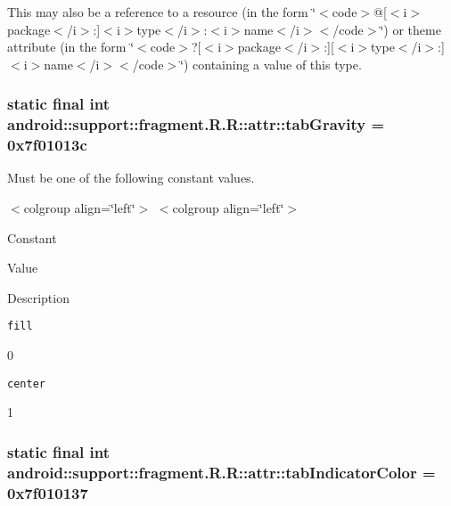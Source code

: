 This may also be a reference to a resource (in the form \char`\"{}$<$code$>$@\mbox{[}$<$i$>$package$<$/i$>$:\mbox{]}$<$i$>$type$<$/i$>$:$<$i$>$name$<$/i$>$$<$/code$>$\char`\"{}) or theme attribute (in the form \char`\"{}$<$code$>$?\mbox{[}$<$i$>$package$<$/i$>$:\mbox{]}\mbox{[}$<$i$>$type$<$/i$>$:\mbox{]}$<$i$>$name$<$/i$>$$<$/code$>$\char`\"{}) containing a value of this type. \hypertarget{classandroid_1_1support_1_1fragment_1_1_r_1_1attr_826d5b446736f3a43e3b5326ef0a6fce}{
\subsubsection[{tabGravity}]{\setlength{\rightskip}{0pt plus 5cm}static final int android::support::fragment.R.R::attr::tabGravity = 0x7f01013c}}
\label{classandroid_1_1support_1_1fragment_1_1_r_1_1attr_826d5b446736f3a43e3b5326ef0a6fce}


Must be one of the following constant values. \begin{TabularC}{0}
\hline
\end{TabularC}
$<$colgroup align=\char`\"{}left\char`\"{}$>$ $<$colgroup align=\char`\"{}left\char`\"{}$>$ 

Constant

Value

Description 

{\tt fill}

0

{\tt center}

1\hypertarget{classandroid_1_1support_1_1fragment_1_1_r_1_1attr_53a1c585f5764645fc48fe2747f85e4c}{
\subsubsection[{tabIndicatorColor}]{\setlength{\rightskip}{0pt plus 5cm}static final int android::support::fragment.R.R::attr::tabIndicatorColor = 0x7f010137}}
\label{classandroid_1_1support_1_1fragment_1_1_r_1_1attr_53a1c585f5764645fc48fe2747f85e4c}


